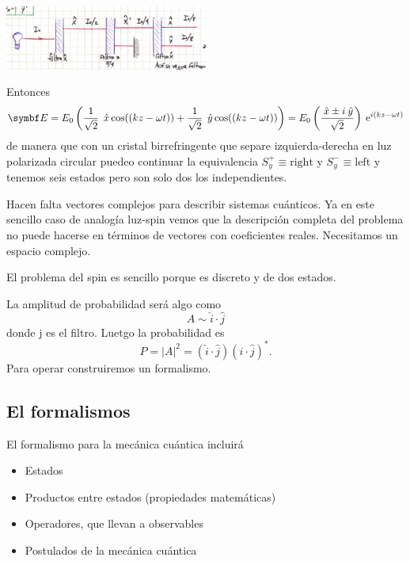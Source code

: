 \documentclass[10pt,oneside]{CBFT_book}
\begin{document}
\includegraphics[width=0.5\textwidth]{images/fig_ft2_polarizacion_3.jpg}

Entonces
\[
	\vb E = E_0 \left( 
	\frac{1}{\sqrt{2}} \: \xver \cos( (kz-\omega t) ) + \frac{1}{\sqrt{2}} \: \yver \cos( (kz-\omega t) )
	\right) =
	E_0 \left( \frac{ \xver \pm i \yver }{\sqrt{2}} \right) \euler^{i(kz-\omega t)}
\]
de manera que con un cristal birrefringente que separe izquierda-derecha en luz polarizada
circular puedeo continuar la equivalencia
$S_y^+ \equiv \text{right}$ y $S_y^- \equiv \text{left}$ y tenemos seis estados pero son
solo dos los independientes.

Hacen falta vectores complejos para describir sistemas cuánticos. Ya en este sencillo caso
de analogía luz-spin vemos que la descripción completa del problema no puede hacerse en
términos de vectores con coeficientes reales.
Necesitamos un espacio complejo.

El problema del spin es sencillo porque es discreto y de dos estados.

La amplitud de probabilidad será algo como
\[
	A \sim \hat{i} \cdot \hat{j}
\]
donde j es el filtro. Luetgo la probabilidad es
\[
	P = |A|^2 = (\hat{i} \cdot \hat{j})(\hat{i} \cdot \hat{j})^*.
\]
Para operar construiremos un formalismo.

\subsection{El formalismos}

El formalismo para la mecánica cuántica incluirá
\begin{itemize}
	\item Estados
	\item Productos entre estados (propiedades matemáticas)
	\item Operadores, que llevan a observables
	\item Postulados de la mecánica cuántica
\end{itemize}
\end{document}
